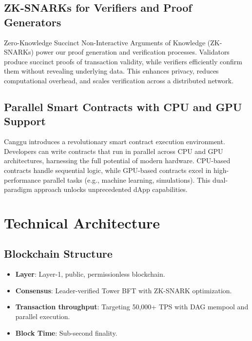 \documentclass[12pt]{article}
\begin{document}
\subsection{ZK-SNARKs for Verifiers and Proof Generators}
\begin{justify}
    Zero-Knowledge Succinct Non-Interactive Arguments of Knowledge (ZK-SNARKs) power our proof generation and verification processes. Validators produce succinct proofs of transaction validity, while verifiers efficiently confirm them without revealing underlying data. This enhances privacy, reduces computational overhead, and scales verification across a distributed network.    
\end{justify}

\subsection{Parallel Smart Contracts with CPU and GPU Support}
\begin{justify}
Canggu introduces a revolutionary smart contract execution environment. Developers can write contracts that run in parallel across CPU and GPU architectures, harnessing the full potential of modern hardware. CPU-based contracts handle sequential logic, while GPU-based contracts excel in high-performance parallel tasks (e.g., machine learning, simulations). This dual-paradigm approach unlocks unprecedented dApp capabilities.
    
\end{justify}

\section{Technical Architecture}
\subsection{Blockchain Structure}
\begin{itemize}
    \item \textbf{Layer}: Layer-1, public, permissionless blockchain.
    \item \textbf{Consensus}: Leader-verified Tower BFT with ZK-SNARK optimization.
    \item \textbf{Transaction throughput}: Targeting 50,000+ TPS with DAG mempool and parallel execution.
    \item \textbf{Block Time}: Sub-second finality.
\end{itemize}
\end{document}
